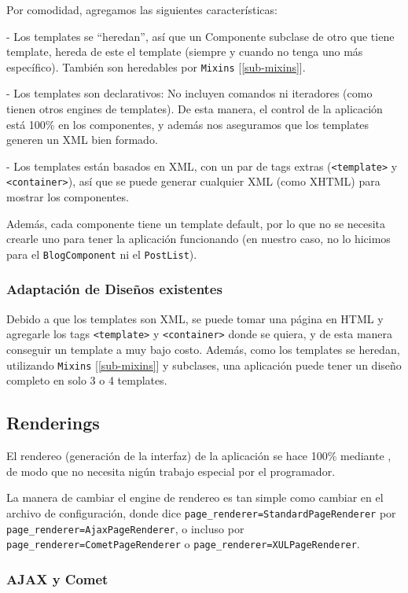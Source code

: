 Por comodidad, agregamos las siguientes características:

- Los templates se ``heredan'', así que un Componente subclase de otro que tiene template, hereda de este el template (siempre y cuando no tenga uno más específico). También son heredables por \verb"Mixins" [\ref{sub-mixins}].

- Los templates son declarativos: No incluyen comandos ni iteradores (como tienen otros engines de templates). De esta manera, el control de la aplicación está 100\% en los componentes, y además nos aseguramos que los templates generen un XML bien formado.

- Los templates están basados en XML, con un par de tags extras (\verb"<template>" y \verb"<container>"), así que se puede generar cualquier XML (como XHTML) para mostrar los componentes.

Además, cada componente tiene un template default, por lo que no se necesita crearle uno para tener la aplicación funcionando (en nuestro caso, no lo hicimos para el \verb"BlogComponent" ni el \verb"PostList").

\subsubsection{Adaptación de Diseños existentes}
\label{sub-templates-adapt}
Debido a que los templates son XML, se puede tomar una página en HTML y agregarle los tags \verb"<template>" y \verb"<container>" donde se quiera, y de esta manera conseguir un template a muy bajo costo. Además, como los templates se heredan, utilizando \verb"Mixins" [\ref{sub-mixins}] y subclases, una aplicación puede tener un diseño completo en solo 3 o 4 templates.

\subsection{Renderings}
\label{sub-render}
El rendereo (generación de la interfaz) de la aplicación se hace 100\% mediante \PWB, de modo que no necesita nigún trabajo especial por el programador.

La manera de cambiar el engine de rendereo es tan simple como cambiar en el archivo de configuración, donde dice \verb"page_renderer=StandardPageRenderer" por \verb"page_renderer=AjaxPageRenderer", o incluso por \verb"page_renderer=CometPageRenderer" o \verb"page_renderer=XULPageRenderer".

\subsubsection{AJAX y Comet}

